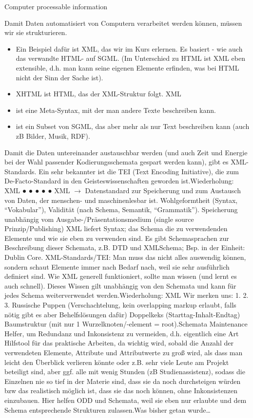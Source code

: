 
\begin{frame}{Computer processable information}
    

Damit Daten automatisiert von Computern verarbeitet werden können, müssen wir sie
strukturieren.
\begin{itemize}
\item Ein Beispiel dafür ist XML, das wir im Kurs erlernen. Es basiert - wie auch das verwandte
HTML- auf SGML. (Im Unterschied zu HTML ist XML eben extensible, d.h. man kann seine
eigenen Elemente erfinden, was bei HTML nicht der Sinn der Sache ist).
\item XHTML ist HTML, das der XML-Struktur folgt.
XML
\item ist eine Meta-Syntax, mit der man andere Texte beschreiben kann.
\item ist ein Subset von SGML, das aber mehr als nur Text beschreiben kann (auch zB Bilder,
Musik, RDF).
\end{itemize}
Damit die Daten untereinander austauschbar werden (und auch Zeit und Energie bei der Wahl
passender Kodierungsschemata gespart werden kann), gibt es XML-Standards.
Ein sehr bekannter ist die TEI (Text Encoding Initiative), die zum De-Facto-Standard in den
Geisteswissenschaften geworden ist.Wiederholung: XML
●
●
●
●
●
XML $\to$ Datenstandard zur Speicherung und zum Austausch von Daten, der menschen- und
maschinenlesbar ist.
Wohlgeformtheit (Syntax, “Vokabular”), Validität (nach Schema, Semantik, “Grammatik”).
Speicherung unabhängig vom Ausgabe-/Präsentationsmedium (single source
Prinzip/Publishing)
XML liefert Syntax; das Schema die zu verwendenden Elemente und wie sie eben zu verwenden
sind. Es gibt Schemasprachen zur Beschreibung dieser Schemata, z.B. DTD und XMLSchema;
Bsp. in der Einheit: Dublin Core.
XML-Standards/TEI: Man muss das nicht alles auswendig können, sondern schaut Elemente
immer nach Bedarf nach, weil sie sehr ausführlich definiert sind. Wie XML generell funktioniert,
sollte man wissen (und lernt es auch schnell). Dieses Wissen gilt unabhängig von den Schemata
und kann für jedes Schema weiterverwendet werden.Wiederholung: XML
Wir merken uns:
1.
2.
3.
Russische Puppen (Verschachtelung, kein
overlapping markup erlaubt, falls nötig gibt es aber
Behelfslösungen dafür)
Doppelkeks (Starttag-Inhalt-Endtag)
Baumstruktur (mit nur 1 Wurzelknoten/-element =
root).Schemata
Maintenance Helfer, um Redundanz und Inkonsistenz zu vermeiden, d.h. eigentlich eine Art
Hilfstool für das praktische Arbeiten, da wichtig wird, sobald die Anzahl der verwendeten Elemente,
Attribute und Attributwerte zu groß wird, als dass man leicht den Überblick verlieren könnte oder z.B. sehr
viele Leute am Projekt beteiligt sind, aber ggf. alle mit wenig Stunden (zB Studienassistenz), sodass die
Einzelnen nie so tief in der Materie sind, dass sie da noch durchsteigen würden bzw das realistisch
möglich ist, dass sie das noch können, ohne Inkonsistenzen einzubauen. Hier helfen ODD und Schemata,
weil sie eben nur erlaubte und dem Schema entsprechende Strukturen zulassen.Was bisher getan wurde\dots
\end{frame}
